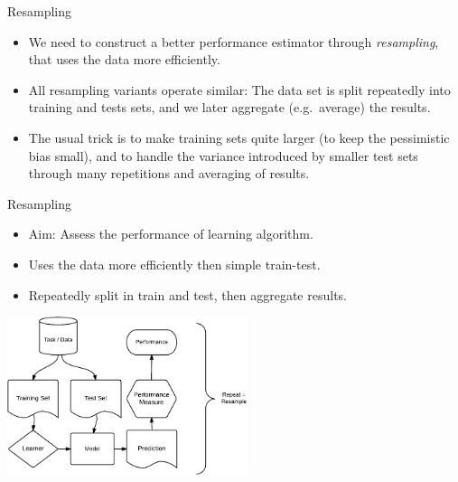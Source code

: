 \begin{frame}{Resampling}

\begin{itemize}
\item
  We need to construct a better performance estimator through
  \emph{resampling}, that uses the data more efficiently.
\item
  All resampling variants operate similar: The data set is split
  repeatedly into training and tests sets, and we later aggregate
  (e.g.~average) the results.
\item
  The usual trick is to make training sets quite larger (to keep the
  pessimistic bias small), and to handle the variance introduced by
  smaller test sets through many repetitions and averaging of results.
\end{itemize}

\end{frame}

\begin{frame}{Resampling}

\begin{itemize}
\item
  Aim: Assess the performance of learning algorithm.
\item
  Uses the data more efficiently then simple train-test.
\item
  Repeatedly split in train and test, then aggregate results.
\end{itemize}

\begin{center}
\includegraphics[width=7cm]{plots/ml_abstraction-crop.pdf}
\end{center}

\end{frame}

